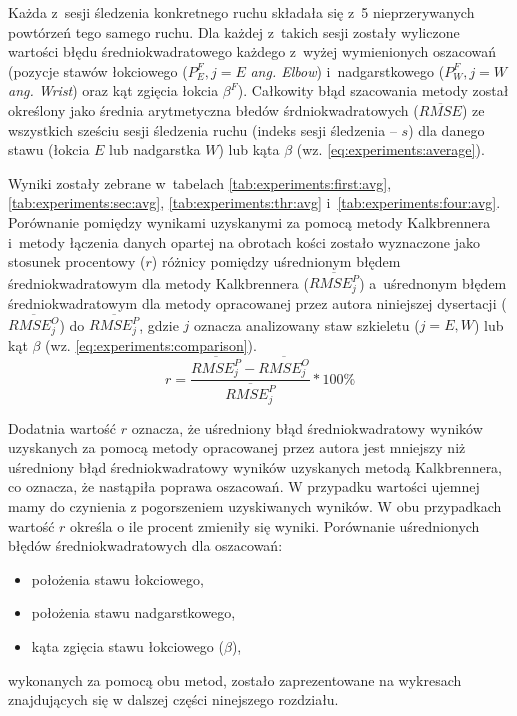 Każda z~sesji śledzenia konkretnego ruchu składała się z~5 nieprzerywanych powtórzeń tego samego ruchu. Dla każdej z~takich sesji zostały wyliczone wartości błędu średniokwadratowego każdego z~wyżej wymienionych oszacowań (pozycje stawów łokciowego ($P^F_E, j = E$  \emph{ang. Elbow}) i~nadgarstkowego ($P^F_W, j = W$ \emph{ang. Wrist}) oraz kąt zgięcia łokcia $\beta^F$). Całkowity błąd szacowania metody został określony jako średnia arytmetyczna błedów śrdniokwadratowych ($\overline{RMSE}$) ze wszystkich sześciu sesji śledzenia ruchu (indeks sesji śledzenia -- $s$) dla danego stawu (łokcia $E$ lub nadgarstka $W$) lub kąta $\beta$ (wz. \ref{eq:experiments:average}).
						
		
Wyniki zostały zebrane w~tabelach \ref{tab:experiments:first:avg}, \ref{tab:experiments:sec:avg}, \ref{tab:experiments:thr:avg} i~\ref{tab:experiments:four:avg}.
Porównanie pomiędzy wynikami uzyskanymi za pomocą metody Kalkbrennera i~metody łączenia danych opartej na obrotach kości zostało wyznaczone jako stosunek procentowy ($r$) różnicy pomiędzy uśrednionym błędem średniokwadratowym dla metody Kalkbrennera ($\overline{RMSE^P_j}$) a~uśrednonym błędem średniokwadratowym dla metody opracowanej przez autora niniejszej dysertacji ($\overline{RMSE^O_j}$) do $\overline{RMSE^P_j}$, gdzie $j$ oznacza analizowany staw szkieletu ($j=E, W$) lub kąt $\beta$ (wz. \ref{eq:experiments:comparison}). \\
						
\begin{equation}
	r = \frac{\overline{RMSE^P_j} - \overline{RMSE^O_j}}{\overline{RMSE^P_j}} * 100\%
	\label{eq:experiments:comparison}
\end{equation}
						
Dodatnia wartość $r$ oznacza, że uśredniony błąd średniokwadratowy wyników uzyskanych za pomocą metody opracowanej przez autora jest mniejszy niż uśredniony błąd średniokwadratowy wyników uzyskanych metodą Kalkbrennera, co oznacza, że nastąpiła poprawa oszacowań. W przypadku wartości ujemnej mamy do czynienia z pogorszeniem uzyskiwanych wyników. W obu przypadkach wartość $r$ określa o ile procent zmieniły się wyniki. Porównanie uśrednionych błędów średniokwadratowych dla oszacowań:
\begin{itemize}
	\item położenia stawu łokciowego,
	\item położenia stawu nadgarstkowego,
	\item kąta zgięcia stawu łokciowego ($\beta$),
\end{itemize}
wykonanych za pomocą obu metod, zostało zaprezentowane na wykresach znajdujących się w dalszej części ninejszego rozdziału.
						
